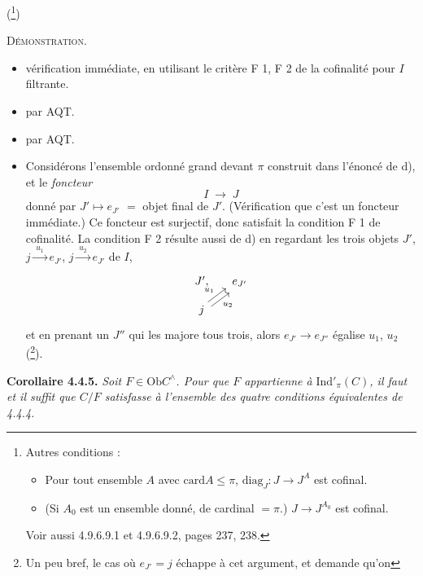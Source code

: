 \documentclass[11pt]{article}
\newcommand{\printedpage}[1]{\marginpar{\footnotesize p.~#1}}
\newcommand{\Ind}{\mathrm{Ind}}
\newcommand{\card}{\mathrm{card}}
\newcommand{\Ob}{\mathrm{Ob}}
\begin{document}
(\footnote{Autres conditions :
\begin{itemize}[leftmargin=3em]
\item[e)] Pour tout ensemble $A$ avec $\card A \leqslant \pi$, $\mathrm{diag}_J : J \longrightarrow J^A$ est cofinal.
\item[e$'$)] (Si $A_0$ est un ensemble donné, de cardinal $= \pi$.) $J \longrightarrow J^{A_0}$ est cofinal.
\end{itemize}
Voir aussi 4.9.6.9.1 et 4.9.6.9.2, pages 237, 238.})

\textsc{Démonstration}.
\begin{itemize}[leftmargin=7em,labelwidth=6em,align=left]
\item[a $\;\Longrightarrow\;$ b] vérification immédiate, en utilisant le critère F 1, F 2 de la cofinalité pour $I$ filtrante.
\item[b $\;\Longrightarrow\;$ c] par AQT.
\item[c $\;\Longrightarrow\;$ d] par AQT.
\end{itemize}

\printedpage{18}
\begin{itemize}[leftmargin=7em,labelwidth=6em,align=left]
\item[d $\;\Longrightarrow\;$ a] Considérons l'ensemble ordonné grand devant $\pi$ construit dans l'énoncé de d), et le \textit{foncteur}
\[
I \;\longrightarrow\; J
\]
donné par $J' \longmapsto e_{J'}$ $=$ objet final de $J'$. (Vérification que c'est un foncteur immédiate.) Ce foncteur est surjectif, donc satisfait la condition F 1 de cofinalité. La condition F 2 résulte aussi de d) en regardant les trois objets $J'$, $j \xrightarrow{\;u_1\;} e_{J'}$, $j \xrightarrow{\;u_2\;} e_{J'}$ de $I$,
\[
\begin{tikzcd}[column sep=small, row sep=small]
J', & e_{J'} \\
j \arrow[ur, shift left, "u_1"] \arrow[ur, shift right, "u_2"'] &
\end{tikzcd}
\]
et en prenant un $J''$ qui les majore tous trois, alors $e_{J'} \longrightarrow e_{J''}$ égalise $u_1$, $u_2$ (\footnote{Un peu bref, le cas où $e_{J'} = j$ échappe à cet argument, et demande qu'on}).
\end{itemize}

\textbf{Corollaire 4.4.5.} \textit{Soit $F \in \Ob C^{\wedge}$. Pour que $F$ appartienne à} $\Ind'_\pi(C)$\textit{, il faut et il suffit que $C/F$ satisfasse à l'ensemble des quatre conditions équivalentes de 4.4.4.}
\end{document}
